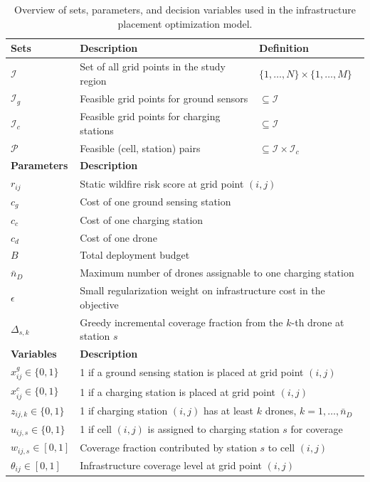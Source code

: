 \documentclass[pdflatex,sn-mathphys-num]{sn-jnl}%
\theoremstyle{thmstyleone}%
\theoremstyle{thmstyletwo}%
\theoremstyle{thmstylethree}%
\newcommand{\set}[1]{\mathcal{#1}}
\begin{document}
\begin{table}[htbp]
\centering
\small
\caption{Overview of sets, parameters, and decision variables used in the infrastructure placement optimization model.}
\label{tab:infra_overview}
\begin{tabular}{lll}
\toprule
\textbf{Sets} & \textbf{Description} & \textbf{Definition} \\
\midrule
$\set I$ & Set of all grid points in the study region & $\{1,\dots,N\}\times\{1,\dots,M\}$ \\
$\set I_{g}$ & Feasible grid points for ground sensors & $\subseteq \set I$ \\
$\set I_{c}$ & Feasible grid points for charging stations & $\subseteq \set I$ \\
$\set P$ & Feasible (cell, station) pairs & $\subseteq \set I\times\set I_c$ \\

\midrule
\textbf{Parameters} & \multicolumn{2}{l}{\textbf{Description}} \\
\midrule
$r_{ij}$ & \multicolumn{2}{l}{Static wildfire risk score at grid point $(i,j)$} \\
$c_g$ & \multicolumn{2}{l}{Cost of one ground sensing station} \\
$c_c$ & \multicolumn{2}{l}{Cost of one charging station} \\
$c_d$ & \multicolumn{2}{l}{Cost of one drone} \\
$B$ & \multicolumn{2}{l}{Total deployment budget} \\
$\bar n_D$ & \multicolumn{2}{l}{Maximum number of drones assignable to one charging station} \\
$\epsilon$ & \multicolumn{2}{l}{Small regularization weight on infrastructure cost in the objective} \\
$\Delta_{s,k}$ & \multicolumn{2}{l}{Greedy incremental coverage fraction from the $k$-th drone at station $s$} \\

\midrule
\textbf{Variables} & \multicolumn{2}{l}{\textbf{Description}} \\
\midrule
$x^g_{ij} \in \{0,1\}$ & \multicolumn{2}{l}{1 if a ground sensing station is placed at grid point $(i,j)$} \\
$x^c_{ij} \in \{0,1\}$ & \multicolumn{2}{l}{1 if a charging station is placed at grid point $(i,j)$} \\
$z_{ij,k} \in \{0,1\}$ & \multicolumn{2}{l}{1 if charging station $(i,j)$ has at least $k$ drones, $k=1,\dots,\bar n_D$} \\
$u_{ij,s} \in \{0,1\}$ & \multicolumn{2}{l}{1 if cell $(i,j)$ is assigned to charging station $s$ for coverage} \\
$w_{ij,s} \in [0,1]$ & \multicolumn{2}{l}{Coverage fraction contributed by station $s$ to cell $(i,j)$} \\
$\theta_{ij} \in [0,1]$ & \multicolumn{2}{l}{Infrastructure coverage level at grid point $(i,j)$} \\
\bottomrule
\end{tabular}
\normalsize
\end{table}
\end{document}
